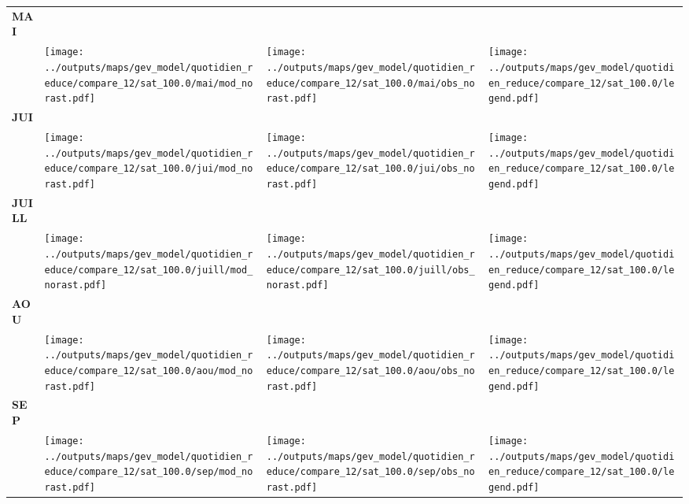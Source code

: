 \documentclass[
  letterpaper,
  DIV=11,
  numbers=noendperiod]{scrartcl}
\begin{document}
\begin{longtable*}{m{2.0cm}m{7.9cm}m{7.9cm}m{1cm}}
\centering \textbf{MAI} \\[0.2em] \begin{tabular}{r@{\hspace{0.2em}}l}\end{tabular} & \centering \texttt{[image: ../outputs/maps/gev\_model/quotidien\_reduce/compare\_12/sat\_100.0/mai/mod\_norast.pdf]} & \centering \texttt{[image: ../outputs/maps/gev\_model/quotidien\_reduce/compare\_12/sat\_100.0/mai/obs\_norast.pdf]} & \centering \texttt{[image: ../outputs/maps/gev\_model/quotidien\_reduce/compare\_12/sat\_100.0/legend.pdf]} \tabularnewline
\centering \textbf{JUI} \\[0.2em] \begin{tabular}{r@{\hspace{0.2em}}l}\end{tabular} & \centering \texttt{[image: ../outputs/maps/gev\_model/quotidien\_reduce/compare\_12/sat\_100.0/jui/mod\_norast.pdf]} & \centering \texttt{[image: ../outputs/maps/gev\_model/quotidien\_reduce/compare\_12/sat\_100.0/jui/obs\_norast.pdf]} & \centering \texttt{[image: ../outputs/maps/gev\_model/quotidien\_reduce/compare\_12/sat\_100.0/legend.pdf]} \tabularnewline
\centering \textbf{JUILL} \\[0.2em] \begin{tabular}{r@{\hspace{0.2em}}l}\end{tabular} & \centering \texttt{[image: ../outputs/maps/gev\_model/quotidien\_reduce/compare\_12/sat\_100.0/juill/mod\_norast.pdf]} & \centering \texttt{[image: ../outputs/maps/gev\_model/quotidien\_reduce/compare\_12/sat\_100.0/juill/obs\_norast.pdf]} & \centering \texttt{[image: ../outputs/maps/gev\_model/quotidien\_reduce/compare\_12/sat\_100.0/legend.pdf]} \tabularnewline
\centering \textbf{AOU} \\[0.2em] \begin{tabular}{r@{\hspace{0.2em}}l}\end{tabular} & \centering \texttt{[image: ../outputs/maps/gev\_model/quotidien\_reduce/compare\_12/sat\_100.0/aou/mod\_norast.pdf]} & \centering \texttt{[image: ../outputs/maps/gev\_model/quotidien\_reduce/compare\_12/sat\_100.0/aou/obs\_norast.pdf]} & \centering \texttt{[image: ../outputs/maps/gev\_model/quotidien\_reduce/compare\_12/sat\_100.0/legend.pdf]} \tabularnewline
\centering \textbf{SEP} \\[0.2em] \begin{tabular}{r@{\hspace{0.2em}}l}\end{tabular} & \centering \texttt{[image: ../outputs/maps/gev\_model/quotidien\_reduce/compare\_12/sat\_100.0/sep/mod\_norast.pdf]} & \centering \texttt{[image: ../outputs/maps/gev\_model/quotidien\_reduce/compare\_12/sat\_100.0/sep/obs\_norast.pdf]} & \centering \texttt{[image: ../outputs/maps/gev\_model/quotidien\_reduce/compare\_12/sat\_100.0/legend.pdf]} \tabularnewline

\end{longtable*}
\end{document}
